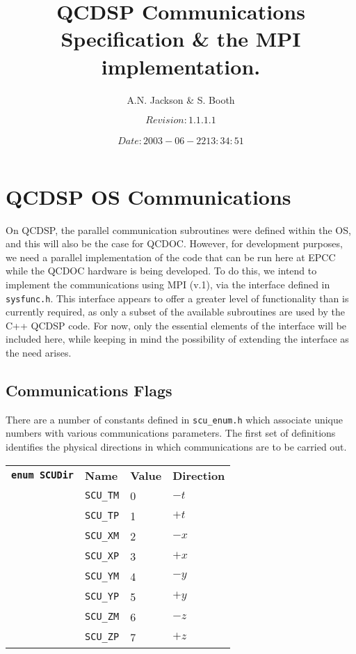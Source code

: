 \documentclass[12pt]{article}
\title{QCDSP Communications Specification \& the MPI implementation.}
\author{A.N. Jackson \& S. Booth}
\date{\mbox{\small $$Revision: 1.1.1.1 $$  $$Date: 2003-06-22 13:34:51 $$}}
\newcommand{\cde}[1]{{\tt #1}}            %
\begin{document}
\maketitle

\tableofcontents
\newpage

\section{QCDSP OS Communications}
On QCDSP, the parallel communication subroutines were defined within
the OS, and this will also be the case for QCDOC.  However, for
development purposes, we need a parallel implementation of the code
that can be run here at EPCC while the QCDOC hardware is being
developed.  To do this, we intend to implement the communications
using MPI (v.1), via the interface defined in \cde{sysfunc.h}.  This
interface appears to offer a greater level of functionality than is
currently required, as only a subset of the available subroutines are
used by the C++ QCDSP code.  For now, only the essential elements of
the interface will be included here, while keeping in mind the
possibility of extending the interface as the need arises.

\subsection{Communications Flags}
\label{col:comm:flags}
There are a number of constants defined in \cde{scu\_enum.h} which
associate unique numbers with various communications parameters.  The
first set of definitions identifies the physical directions in which
communications are to be carried out.

\begin{tabular}{llll}
\cde{{\bf enum SCUDir}} & {\bf Name} & {\bf Value} & {\bf Direction} \\
			&\cde{SCU\_\-TM} & 0 & $-t$\\
			&\cde{SCU\_\-TP} & 1 & $+t$\\
			&\cde{SCU\_\-XM} & 2 & $-x$\\
			&\cde{SCU\_\-XP} & 3 & $+x$\\
			&\cde{SCU\_\-YM} & 4 & $-y$\\
			&\cde{SCU\_\-YP} & 5 & $+y$\\
			&\cde{SCU\_\-ZM} & 6 & $-z$\\
			&\cde{SCU\_\-ZP} & 7 & $+z$
\end{tabular}
\end{document}
